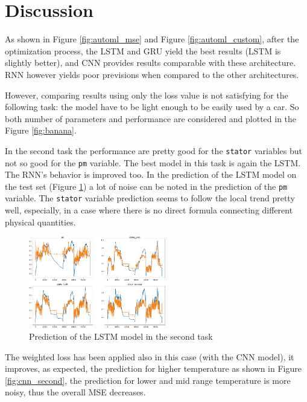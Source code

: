 \section{Discussion}
As shown in Figure \ref{fig:automl_mse} and Figure \ref{fig:automl_custom}, after the optimization process, the LSTM and GRU yield the best results (LSTM is slightly better), and CNN provides results comparable with these architecture.
RNN however yields poor previsions when compared to the other architectures.

However, comparing results using only the loss value is not satisfying for the following task: the model have to be light enough to be easily used by a car. So both number of parameters and performance are considered and plotted in the Figure \ref{fig:banana}. %


In the second task the performance are pretty good for the \verb|stator| variables but not so good for the \verb|pm| variable.
The best model in this task is again the LSTM.
The RNN's behavior is improved too.
In the prediction of the LSTM model on the test set (Figure \ref{fig:lstm_second}) a lot of noise can be noted in the prediction of the \verb|pm| variable.
The \verb|stator| variable prediction seems to follow the local trend pretty well, especially, in a case where there is no direct formula connecting different physical quantities.

\begin{figure}[!h]
    \centering
    \includegraphics[width=\linewidth, height=4cm]{imgs/lstm_pred_second.png}
    \caption{Prediction of the LSTM model in the second task}
    \label{fig:lstm_second}
\end{figure}


The weighted loss has been applied also in this case (with the CNN model), it improves, as expected, the prediction for higher temperature as shown in Figure \ref{fig:cnn_second}, the prediction for lower and mid range temperature is more noisy, thus the overall MSE decreases.

